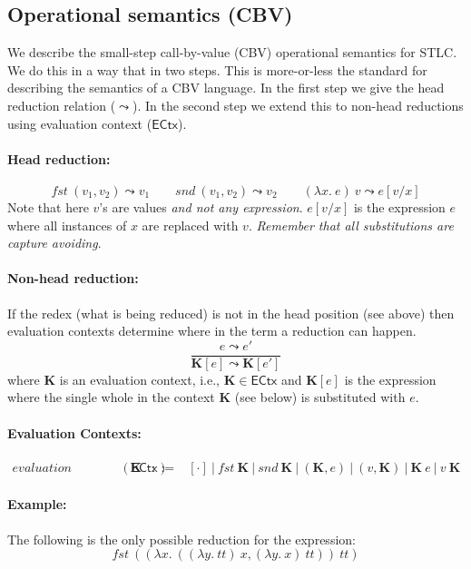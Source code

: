 \documentclass{article}
\newcommand{\gor}{~|~}
\newcommand{\fst}{\mathit{fst}}
\newcommand{\snd}{\mathit{snd}}
\newcommand{\TT}{\mathit{tt}}
\newcommand{\ECTX}{\mathsf{ECtx}}
\newcommand{\ectx}{\mathbf{K}}
\begin{document}
\subsection{Operational semantics (CBV)}
We describe the small-step call-by-value (CBV) operational semantics for STLC. We do this in a way that in two steps. This is  more-or-less the standard for describing the semantics of a CBV language.
In the first step we give the head reduction relation ($\leadsto$).
In the second step we extend this to non-head reductions using
evaluation context ($\ECTX$).

\paragraph{Head reduction:}
\[
\fst~(v_1, v_2) \leadsto v_1 \hspace{2em}
\snd~(v_1, v_2) \leadsto v_2 \hspace{2em}
(\lambda x.~e)~v \leadsto e[v/x]
\]
Note that here $v$'s are values \emph{and not any expression}.
$e[v/x]$ is the expression $e$ where all instances of $x$ are
replaced with $v$. \emph{Remember that all substitutions are capture avoiding}.
\paragraph{Non-head reduction:} If the redex (what is being reduced) is not in the head position (see above) then evaluation contexts determine where in the term a reduction can happen.
\[
\frac{e \leadsto e'}{\ectx[e] \leadsto \ectx[e']}
\]
where $\ectx$ is an evaluation context, i.e., $\ectx \in \ECTX$
and $\ectx[e]$ is the expression where the single whole in the context $\ectx$ (see below) is substituted with $e$.

\paragraph{Evaluation Contexts:}
\[
\begin{array}{llll}
\textit{evaluation contexts}(\ECTX) &\ectx &::=& [\cdot]
\gor \fst~\ectx \gor \snd~\ectx \gor (\ectx, e) \gor (v, \ectx)
\gor \ectx~e \gor v~\ectx
\end{array}
\]

\paragraph{Example:} The following is the only possible reduction
for the expression:
\[
\fst~((\lambda x.~((\lambda y.~ \TT)~x, (\lambda y.~ x)~\TT))~\TT)
\]
\end{document}
